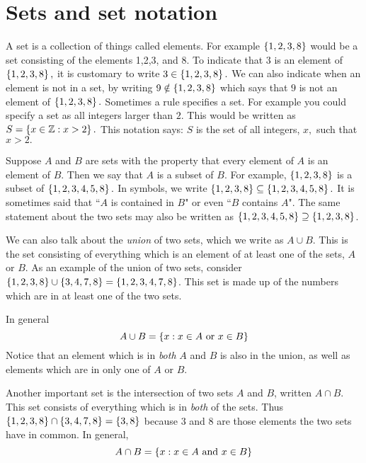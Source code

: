 \section{Sets and set notation}

A set is a collection of things called elements.
For example $\left\{1,2,3,8\right\} $
would be a set consisting of the elements 1,2,3, and 8. To indicate that $3$
is an element of $\left\{1,2,3,8\right\} ,$ it is customary to write $3\in
\left\{1,2,3,8\right\} .$ We can also indicate when an element is not in a set, 
by writing $9\notin \left\{1,2,3,8\right\} $ which says that $9$ is
not an element of $\left\{1,2,3,8\right\} .$ Sometimes a rule specifies a
set. For example you could specify a set as all integers larger than $2.$
This would be written as $S=\left\{x\in \mathbb{Z}:x>2\right\} .$ This
notation says: $S$ is the set of all integers, $x,$ such that $x>2.$

Suppose $A$ and $B$ are sets with the property that every element of $A$ is an
element of $B$. Then we say that $A$ is a subset of $B.$ For example, $\left\{
1,2,3,8\right\} $ is a subset of $\left\{1,2,3,4,5,8\right\}.$ In symbols, we write
$\left\{1,2,3,8\right\} \subseteq \left\{1,2,3,4,5,8\right\} .$ It is
sometimes said that ``$A$ is contained in $B$" or even ``$B$ contains $A$".
The same statement about the two sets may also be written as $\left\{
1,2,3,4,5,8\right\} \supseteq \left\{1,2,3,8\right\} $.

We can also talk about the {\em union\em} of two sets, which we write as $A \cup B$. This is the set consisting of everything which is an
element of at least one of the sets, $A$ or $B$. As an example of the union
of two sets, consider $\left\{1,2,3,8\right\} \cup \left\{3,4,7,8\right\} =\left\{
1,2,3,4,7,8\right\} $. This set is made up of the numbers which are in at least
one of the two sets.\index{$\cup$}

In general
\begin{equation*}
A\cup B = \left\{x:x\in A
\mbox{ or }x\in B\right\} 
\end{equation*}
Notice that an element which is in {\em both\em} $A$ and $B$ is also in the
union, as well as elements which are in only one of $A$ or $B$. 

Another important set is the intersection\index{$\cap$} of two sets $A$ and $B$, written $A \cap B$. This set consists of everything which is in
{\em both\em} of the sets. Thus $\left\{1,2,3,8\right\} \cap \left\{3,4,7,8\right\}
=\left\{3,8\right\} $ because $3$ and $8$ are those elements the two sets
have in common. In general,
\begin{equation*}
A\cap B =  \left\{x:x\in A\mbox{ and }x\in B\right\} 
\end{equation*}

